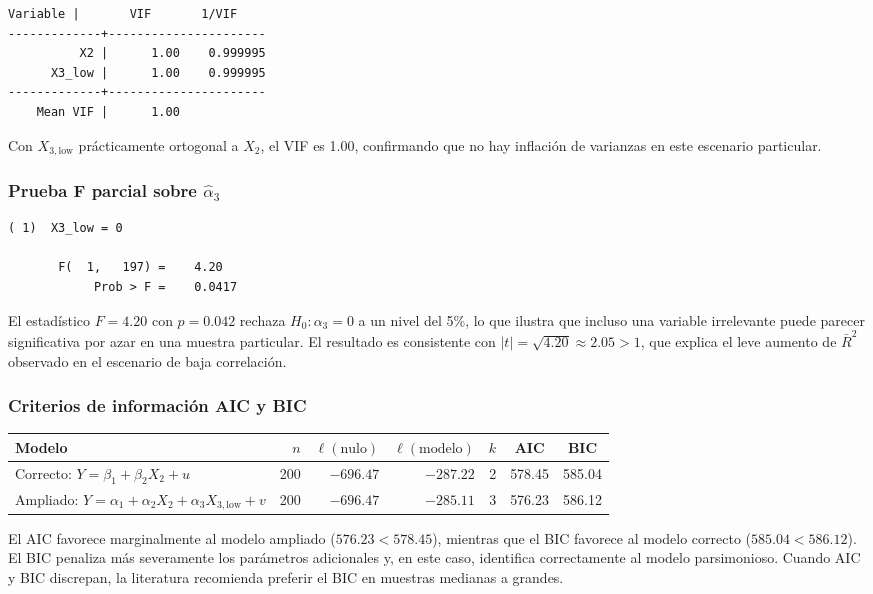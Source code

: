 \documentclass[12pt, letterpaper]{article}
\begin{document}
\begin{lstlisting}[style=stataout]
    Variable |       VIF       1/VIF
-------------+----------------------
          X2 |      1.00    0.999995
      X3_low |      1.00    0.999995
-------------+----------------------
    Mean VIF |      1.00
\end{lstlisting}

Con $X_{3,\text{low}}$ prácticamente ortogonal a $X_2$, el VIF es 1.00,
confirmando que no hay inflación de varianzas en este escenario particular.

\subsubsection{Prueba F parcial sobre $\hat{\alpha}_3$}

\begin{lstlisting}[style=stataout]
 ( 1)  X3_low = 0

       F(  1,   197) =    4.20
            Prob > F =    0.0417
\end{lstlisting}

El estadístico $F = 4.20$ con $p = 0.042$ rechaza $H_0: \alpha_3 = 0$ a
un nivel del 5\%, lo que ilustra que incluso una variable irrelevante puede
parecer significativa por azar en una muestra particular. El resultado es
consistente con $|t| = \sqrt{4.20} \approx 2.05 > 1$, que explica el leve
aumento de $\bar{R}^2$ observado en el escenario de baja correlación.

\subsubsection{Criterios de información AIC y BIC}

\begin{center}
\renewcommand{\arraystretch}{1.3}
\small
\begin{tabular}{lrrrrcc}
\toprule
\textbf{Modelo} & $n$ & $\ell(\text{nulo})$ & $\ell(\text{modelo})$ & $k$ & \textbf{AIC} & \textbf{BIC} \\
\midrule
Correcto: $Y = \beta_1 + \beta_2 X_2 + u$                       & 200 & $-696.47$ & $-287.22$ & 2 & 578.45 & 585.04 \\
Ampliado: $Y = \alpha_1 + \alpha_2 X_2 + \alpha_3 X_{3,\text{low}} + v$ & 200 & $-696.47$ & $-285.11$ & 3 & 576.23 & 586.12 \\
\bottomrule
\end{tabular}
\end{center}

El AIC favorece marginalmente al modelo ampliado ($576.23 < 578.45$), mientras
que el BIC favorece al modelo correcto ($585.04 < 586.12$). El BIC penaliza
más severamente los parámetros adicionales y, en este caso, identifica
correctamente al modelo parsimonioso. Cuando AIC y BIC discrepan, la
literatura recomienda preferir el BIC en muestras medianas a grandes.
\end{document}
